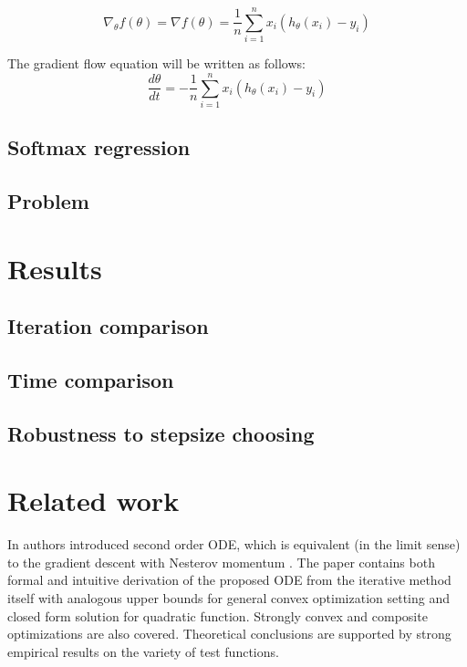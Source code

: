 \documentclass{article}
\begin{document}
\begin{equation}\label{strang:LogReg_grad}
\nabla_\theta f(\theta) = \nabla f(\theta) = \frac{1}{n}\sum\limits_{i=1}^n x_i(h_\theta(x_i) - y_i)
\end{equation}

The gradient flow equation will be written as follows:
\begin{equation}\label{strang:LogReg_GF}
\frac{d \theta}{d t} = - \frac{1}{n}\sum\limits_{i=1}^n x_i(h_\theta(x_i) - y_i)
\end{equation}


\subsection{Softmax regression}
\subsection{Problem}


\section{Results}
\subsection{Iteration comparison}
\subsection{Time comparison}
\subsection{Robustness to stepsize choosing}



\section{Related work}

In \cite{su2014differential} authors introduced second order ODE, which is equivalent (in the limit sense) to the gradient descent with Nesterov momentum \cite{nesterov1983method}. The paper contains both formal and intuitive derivation of the proposed ODE from the iterative method itself with analogous upper bounds for general convex optimization setting and closed form solution for quadratic function. Strongly convex and composite optimizations are also covered. Theoretical conclusions are supported by strong empirical results on the variety of test functions.
\end{document}
